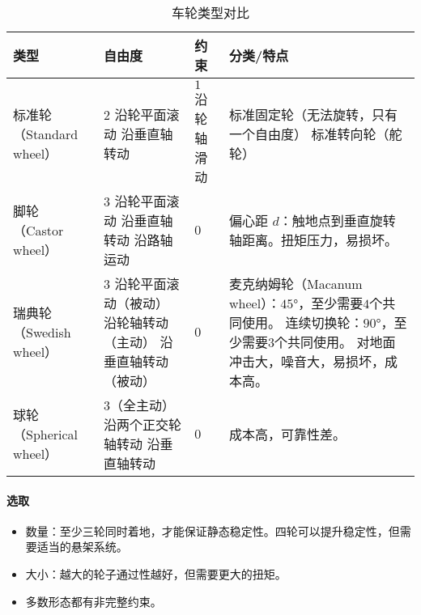 \documentclass[
12pt, %
a4paper, 
oneside, %
headinclude,footinclude, %
]{scrartcl}
\begin{document}
\begin{table}[H]
\centering
\begin{tabular}{|p{2cm}|p{4.2cm}|p{2.2cm}|p{7cm}|}
\hline
类型 & 自由度 & 约束 & 分类/特点 \\
\hline
标准轮 \newline （Standard wheel） & $ 2 $ \newline 沿轮平面滚动 \newline 沿垂直轴转动 & $ 1 $ \newline 沿轮轴滑动 & 标准固定轮（无法旋转，只有一个自由度） \newline 标准转向轮（舵轮） \\
\hline
脚轮 \newline （Castor wheel） & $ 3 $ \newline 沿轮平面滚动 \newline 沿垂直轴转动 \newline 沿路轴运动 & $ 0 $ & 偏心距 $ d $：触地点到垂直旋转轴距离。扭矩压力，易损坏。 \\
\hline
瑞典轮 \newline （Swedish wheel） & $ 3 $ \newline 沿轮平面滚动（被动） \newline 沿轮轴转动（主动） \newline 沿垂直轴转动（被动） & $ 0 $ & 麦克纳姆轮（Macanum wheel）：$ 45° $，至少需要$ 4 $个共同使用。 \newline 连续切换轮：$ 90° $，至少需要$ 3 $个共同使用。 \newline 对地面冲击大，噪音大，易损坏，成本高。 \\
\hline
球轮 \newline （Spherical wheel） & $ 3 $（全主动） \newline 沿两个正交轮轴转动 \newline 沿垂直轴转动 & $ 0 $ & 成本高，可靠性差。 \\
\hline
\end{tabular}
\caption{车轮类型对比}
\end{table}
\paragraph{选取}
\begin{itemize}
\item 数量：至少三轮同时着地，才能保证静态稳定性。四轮可以提升稳定性，但需要适当的悬架系统。
\item 大小：越大的轮子通过性越好，但需要更大的扭矩。
\item 多数形态都有非完整约束。
\end{itemize}
\end{document}
